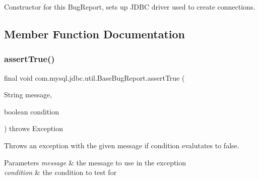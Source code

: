 Constructor for this Bug\+Report, sets up J\+D\+BC driver used to create connections. 

\subsection{Member Function Documentation}
\mbox{\label{classcom_1_1mysql_1_1jdbc_1_1util_1_1_base_bug_report_a5b56a6069b17d432a189c5185ec897c7}} 
\subsubsection{\texorpdfstring{assert\+True()}{assertTrue()}\hspace{0.1cm}{\footnotesize\ttfamily [1/2]}}
{\footnotesize\ttfamily final void com.\+mysql.\+jdbc.\+util.\+Base\+Bug\+Report.\+assert\+True (\begin{DoxyParamCaption}\item[{String}]{message,  }\item[{boolean}]{condition }\end{DoxyParamCaption}) throws Exception\hspace{0.3cm}{\ttfamily [protected]}}

Throws an exception with the given message if condition evalutates to \textquotesingle{}false\textquotesingle{}.


\begin{DoxyParams}{Parameters}
{\em message} & the message to use in the exception \\
\hline
{\em condition} & the condition to test for \\
\hline
\end{DoxyParams}

